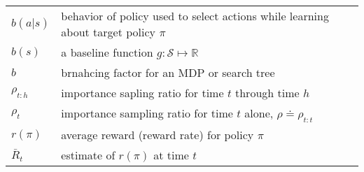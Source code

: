 \documentclass[10pt, landscape, a4paper]{article}
\begin{document}
\begin{multicols}{3}
        \begin{tabular}{ p{} p{} }
            $b(a|s)$     & behavior of policy used to select actions while learning about target policy $\pi$ \\
            $b(s)$       & a baseline function $g: \mathcal{S} \mapsto \mathbb{R}$                            \\
            $b$          & brnahcing factor for an MDP or search tree                                         \\
            $\rho_{t:h}$ & importance sapling ratio for time $t$ through time $h$                             \\
            $\rho_t$     & importance sampling ratio for time $t$ alone, $\rho\doteq \rho_{t:t}$              \\
            $r(\pi)$     & average reward (reward rate) for policy $\pi$                                      \\
            $\bar{R}_t$  & estimate of $r(\pi)$ at time $t$                                                   \\
        \end{tabular}


\end{multicols}
\end{document}
